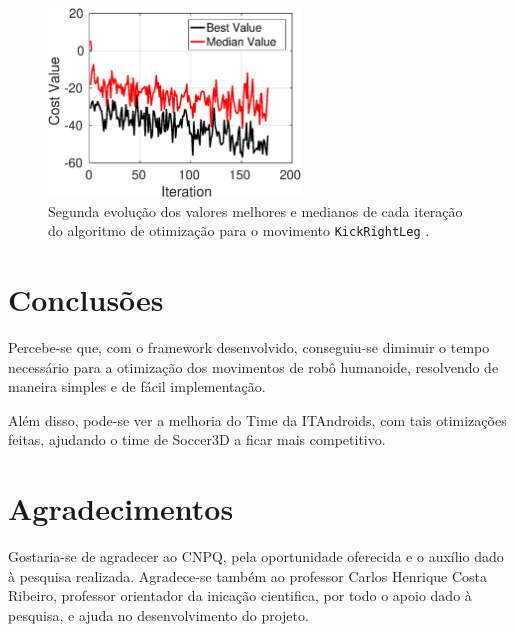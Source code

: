 \documentclass[
10pt, %
a4paper, %
oneside, %
headinclude,footinclude, %
BCOR5mm, %
]{scrartcl}
\newcommand*{\inlinecode}{\texttt}%
\begin{document}
\begin{figure}[htb]
\begin{center}
\includegraphics[width=0.6\textwidth]{otimizacaokick2}
\end{center}
\caption{\label{fig:kickRightLegOptimizationData2}Segunda evolução  dos valores melhores e medianos de cada iteração do algoritmo de otimização para o movimento \inlinecode{KickRightLeg} .}
\end{figure}
	   
	    		
		
	

\section{Conclusões}

	Percebe-se que, com o framework desenvolvido, conseguiu-se diminuir o tempo necessário para a otimização dos movimentos de robô humanoide, resolvendo de maneira simples e de fácil implementação. 
	
	Além disso, pode-se ver a melhoria do Time da ITAndroids, com tais otimizações feitas, ajudando o time de Soccer3D a ficar mais competitivo.


\section{Agradecimentos}

Gostaria-se de agradecer ao CNPQ, pela oportunidade oferecida e o auxílio dado
à pesquisa realizada. Agradece-se também ao professor Carlos Henrique Costa Ribeiro,
professor orientador da inicação cientifica, por todo o apoio dado à pesquisa, e ajuda no
desenvolvimento do projeto.
\end{document}
